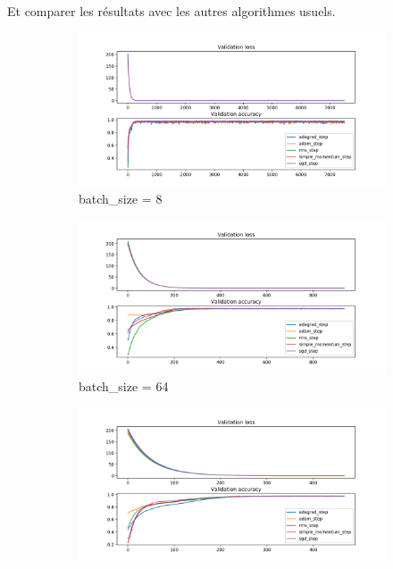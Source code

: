 \documentclass[fleqn,11pt, titlepage, french]{article}
\begin{document}
	Et comparer les résultats avec les autres algorithmes usuels.
	
		
	\begin{figure}[H]
		\centering
		\begin{subfigure}{0.45\textwidth}
			\centering
			\includegraphics[scale=0.25]{../gdsvm/exports/mnist-batch8-comparison.png}
			\caption{batch\_size = 8}
		\end{subfigure}
		\begin{subfigure}{0.45\textwidth}
			\centering
			\includegraphics[scale=0.25]{../gdsvm/exports/mnist-batch64-comparison.png}
			\caption{batch\_size = 64}
		\end{subfigure}
		\begin{subfigure}{0.45\textwidth}
			\centering
			\includegraphics[scale=0.25]{../gdsvm/exports/mnist-batch128-comparison.png}

\end{subfigure}
\end{figure}
\end{document}
